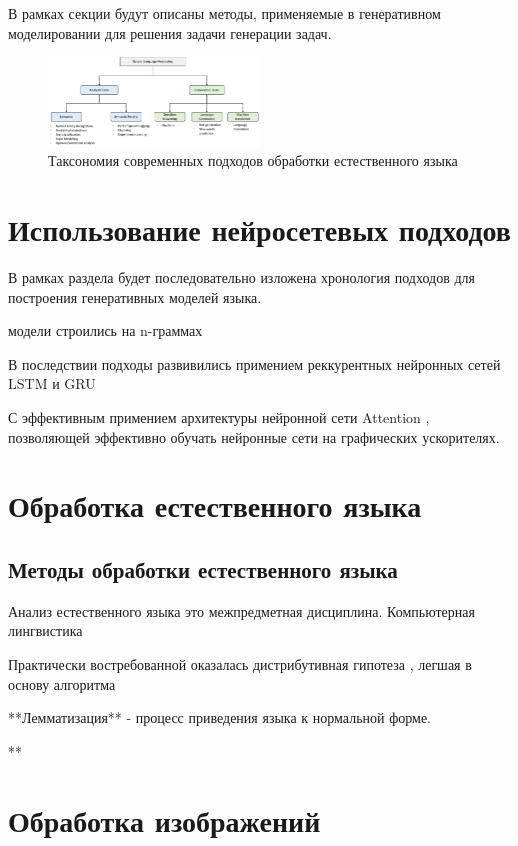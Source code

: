 В рамках секции будут описаны методы, применяемые в генеративном моделировании
для решения задачи генерации задач.


\begin{figure}[h]
    \centering
    \includegraphics[width=0.5\textwidth]{assets/llm/taxonomy.png}
    \caption{Таксономия современных подходов обработки естественного языка}
    \label{llm_taxonomy}
\end{figure}




\section{Использование нейросетевых подходов}

В рамках раздела будет последовательно изложена хронология подходов
для построения генеративных моделей языка.

 модели строились на n-граммах
 


В последствии подходы развивились примением реккурентных нейронных сетей LSTM \cite{HochSchm97} и GRU



С эффективным примением архитектуры нейронной сети Attention \cite{NIPS2017_3f5ee243}, позволяющей эффективно обучать нейронные сети на графических ускорителях. 




\section{Обработка естественного языка}

\subsection{Методы обработки естественного языка}

Анализ естественного языка это межпредметная дисциплина.
Компьютерная лингвистика

Практически востребованной оказалась дистрибутивная гипотеза \cite{Schutze},
легшая в основу алгоритма \cite{NIPS2013_9aa42b31}


**Лемматизация** - процесс приведения языка к нормальной форме.

**


\section{Обработка изображений}


